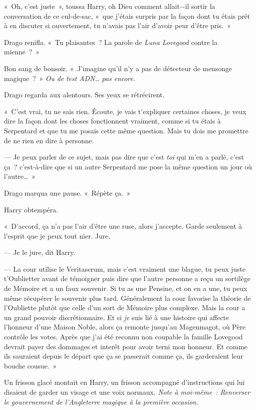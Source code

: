 «~Oh, c'est juste~», toussa Harry, oh Dieu comment allait−il sortir la conversation de ce cul-de-sac, «~que j'étais surpris par la façon dont tu étais prêt à en discuter si ouvertement, tu n'avais pas l'air d'avoir peur d'être pris.~»

Drago renifla. «~Tu plaisantes~? La parole de \emph{Luna Lovegood} contre la mienne~?~»

Bon sang de bonsoir. «~J'imagine qu'il n'y a pas de détecteur de mensonge magique~?~» \emph{Ou de test ADN… pas encore.}

Drago regarda aux alentours. Ses yeux se rétrécirent.

«~C'est vrai, tu ne sais rien. Écoute, je vais t'expliquer certaines choses, je veux dire la façon dont les choses fonctionnent vraiment, comme si tu étais à Serpentard et que tu me posais cette même question. Mais tu dois me promettre de ne rien en dire à personne.

--- Je peux parler de ce sujet, mais pas dire que c'est \emph{toi} qui m'en a parlé, c'est ça~? c'est-à-dire que si un autre Serpentard me pose la même question un jour où l'autre…~»

Drago marqua une pause. «~Répète ça.~»

Harry obtempéra.

«~D'accord, ça n'a pas l'air d'être une ruse, alors j'accepte. Garde seulement à l'esprit que je peux tout nier. Jure.

--- Je le jure, dit Harry.

--- La cour utilise le Veritaserum, mais c'est vraiment une blague, tu peux juste t'Oublietter avant de témoigner puis dire que l'autre personne a reçu un sortilège de Mémoire et a un faux souvenir. Si tu as une Pensine, et on en a une, tu peux même récupérer le souvenir plus tard. Généralement la cour favorise la théorie de l'Oubliette plutôt que celle d'un sort de Mémoire plus complexe. Mais la cour a un grand pouvoir discrétionnaire. Et si \emph{je} suis lié à une histoire qui affecte l'honneur d'une Maison Noble, alors ça remonte jusqu'au Magenmagot, où Père contrôle les votes. Après que j'ai été reconnu non coupable la famille Lovegood devrait payer des dommages et interêt pour avoir terni mon honneur. Et comme ils sauraient depuis le départ que ça se passerait comme ça, ils garderaient leur bouche cousue.~»

Un frisson glacé montait en Harry, un frisson accompagné d'instructions qui lui disaient de garder un visage et une voix normaux. \emph{Note à moi-même~: Renverser le gouvernement de l'Angleterre magique à la première occasion.}

